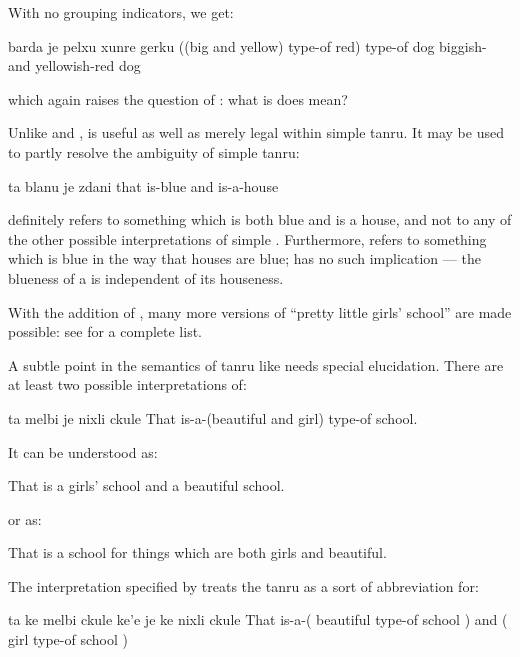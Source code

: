 With no grouping indicators, we get:
\begin{example}
barda je pelxu xunre gerku\n
((big and yellow) type-of red) type-of dog\n
biggish- and yellowish-red dog
\end{example}

{\noindent}which again raises the question of : what is does  mean? 

Unlike  and ,  is useful as well
    as merely legal within simple tanru. It may be used to partly
    resolve the ambiguity of simple tanru:
\begin{example}
ta blanu je zdani\n
that is-blue and is-a-house
\end{example}

{\noindent}definitely refers to something which is both blue and is a
    house, and not to any of the other possible interpretations of
    simple . Furthermore,  refers to
    something which is blue in the way that houses are blue;
     has no such implication --- the blueness of
    a  is independent of its houseness. 

With the addition of , many more versions of ``pretty
    little girls' school'' are made possible: see  for a complete list.

A subtle point in the semantics of tanru like  needs special elucidation. There
    are at least two possible interpretations of:
\begin{example}
ta melbi je nixli ckule\n
That is-a-(beautiful and girl) type-of school.
\end{example}

It can be understood as:
\begin{example}
That is a girls' school and a beautiful school.
\end{example}

{\noindent}or as:
\begin{example}
That is a school for things\n
\T	which are both girls and beautiful.
\end{example}

The interpretation specified by 
    treats the tanru as a sort of abbreviation for:
\begin{example}
ta ke melbi ckule ke'e\n
\T	je ke nixli ckule \n
That is-a-( beautiful type-of school )\n
\T	and ( girl type-of school )
\end{example}

